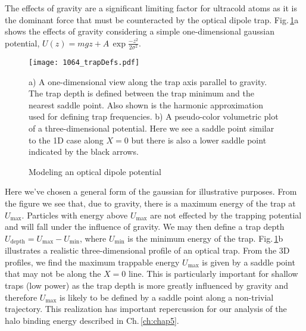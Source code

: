 The effects of gravity are a significant limiting factor for ultracold atoms as it is the dominant force that must be counteracted by the optical dipole trap.
Fig.\,\ref{fig:trapDepth}a shows the effects of gravity considering a simple one-dimensional gaussian potential, $U(z) = mgz + A\,\exp{\frac{-z^2}{2\sigma^2}}$.
	\begin{figure} 
		\centerline{
		\texttt{[image: 1064\_trapDefs.pdf]}}
		\caption{Modeling an optical dipole potential}{a) A one-dimensional view along the trap axis parallel to gravity. The trap depth is defined between the trap minimum and the nearest saddle point. Also shown is the harmonic approximation used for defining trap frequencies. b) A pseudo-color volumetric plot of a three-dimensional potential. Here we see a saddle point similar to the 1D case along $X=0$ but there is also a lower saddle point indicated by the black arrows.}
		\label{fig:trapDepth}
	\end{figure}
Here we've chosen a general form of the gaussian for illustrative purposes.
From the figure we see that, due to gravity, there is a maximum energy of the trap at $U_{\text{max}}$.
Particles with energy above $U_{\text{max}}$ are not effected by the trapping potential and will fall under the influence of gravity.
We may then define a trap depth $U_{\text{depth}} = U_{\text{max}} - U_{\text{min}}$, where $U_{\text{min}}$ is the minimum energy of the trap.
Fig.\,\ref{fig:trapDepth}b illustrates a realistic three-dimensional profile of an optical trap.
From the 3D profiles, we find the maximum trappable energy $U_{\text{max}}$ is given by a saddle point that may not be along the $X=0$ line.
This is particularly important for shallow traps (low power) as the trap depth is more greatly influenced by gravity and therefore $U_{\text{max}}$ is likely to be defined by a saddle point along a non-trivial trajectory.
This realization has important repercussion for our analysis of the halo binding energy described in Ch.\,\ref{ch:chap5}.


